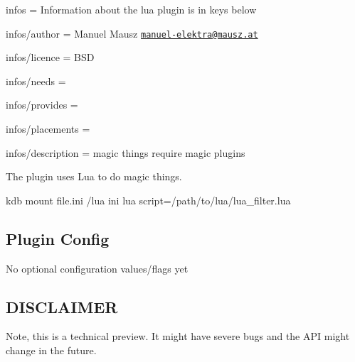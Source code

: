 
\begin{DoxyItemize}
\item infos = Information about the lua plugin is in keys below
\item infos/author = Manuel Mausz \href{mailto:manuel-elektra@mausz.at}{\tt manuel-\/elektra@mausz.\+at}
\item infos/licence = B\+S\+D
\item infos/needs =
\item infos/provides =
\item infos/placements =
\item infos/description = magic things require magic plugins
\end{DoxyItemize}

The plugin uses Lua to do magic things.

\begin{DoxyVerb}kdb mount file.ini /lua ini lua script=/path/to/lua/lua_filter.lua
\end{DoxyVerb}


\subsection*{Plugin Config}

No optional configuration values/flags yet

\subsection*{D\+I\+S\+C\+L\+A\+I\+M\+E\+R}

Note, this is a technical preview. It might have severe bugs and the A\+P\+I might change in the future. 